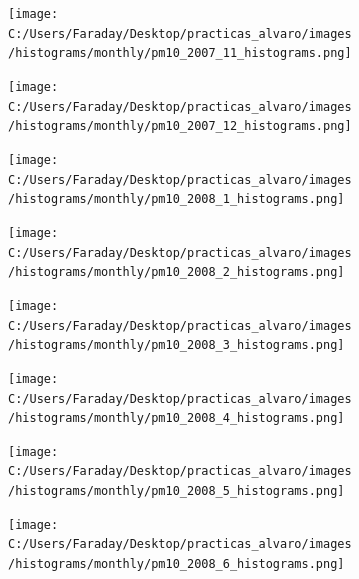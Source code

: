 \documentclass[12pt]{article}
\begin{document}
\begin{figure}[H]
\centering
\begin{subfigure}[h]{0.45\textwidth}
\texttt{[image: C:/Users/Faraday/Desktop/practicas\_alvaro/images/histograms/monthly/pm10\_2007\_11\_histograms.png]}
\caption{}
\label{fig:hist-mon-3-11-2007}
\end{subfigure}
%
\begin{subfigure}[H]{0.45\textwidth}
\texttt{[image: C:/Users/Faraday/Desktop/practicas\_alvaro/images/histograms/monthly/pm10\_2007\_12\_histograms.png]}
\caption{}
\label{fig:hist-mon-3-12-2007}
\end{subfigure}
\caption{}
\end{figure}

\newpage

\begin{figure}[H]
\centering
\begin{subfigure}[h]{0.45\textwidth}
\texttt{[image: C:/Users/Faraday/Desktop/practicas\_alvaro/images/histograms/monthly/pm10\_2008\_1\_histograms.png]}
\caption{}
\label{fig:hist-mon-3-1-2008}
\end{subfigure}
%
\begin{subfigure}[H]{0.45\textwidth}
\texttt{[image: C:/Users/Faraday/Desktop/practicas\_alvaro/images/histograms/monthly/pm10\_2008\_2\_histograms.png]}
\caption{}
\label{fig:hist-mon-3-2-2008}
\end{subfigure}
\caption{}
\end{figure}

\begin{figure}[H]
\centering
\begin{subfigure}[h]{0.45\textwidth}
\texttt{[image: C:/Users/Faraday/Desktop/practicas\_alvaro/images/histograms/monthly/pm10\_2008\_3\_histograms.png]}
\caption{}
\label{fig:hist-mon-3-3-2008}
\end{subfigure}
%
\begin{subfigure}[H]{0.45\textwidth}
\texttt{[image: C:/Users/Faraday/Desktop/practicas\_alvaro/images/histograms/monthly/pm10\_2008\_4\_histograms.png]}
\caption{}
\label{fig:hist-mon-3-4-2008}
\end{subfigure}
\caption{}
\end{figure}

\begin{figure}[H]
\centering
\begin{subfigure}[h]{0.45\textwidth}
\texttt{[image: C:/Users/Faraday/Desktop/practicas\_alvaro/images/histograms/monthly/pm10\_2008\_5\_histograms.png]}
\caption{}
\label{fig:hist-mon-3-5-2008}
\end{subfigure}
%
\begin{subfigure}[H]{0.45\textwidth}
\texttt{[image: C:/Users/Faraday/Desktop/practicas\_alvaro/images/histograms/monthly/pm10\_2008\_6\_histograms.png]}
\caption{}
\label{fig:hist-mon-3-6-2008}
\end{subfigure}
\caption{}
\end{figure}
\end{document}
